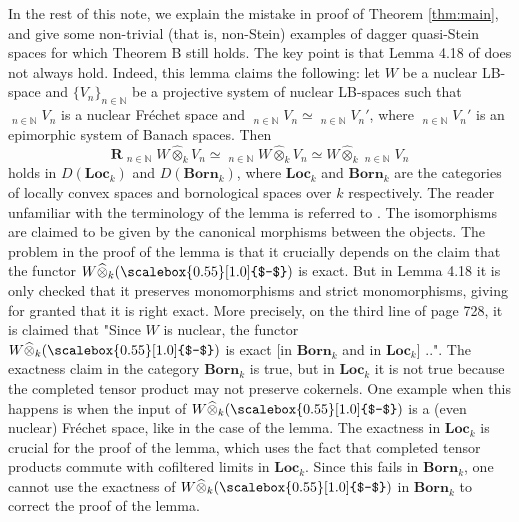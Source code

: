 \documentclass[11pt,leqno,a4paper]{amsart}
\theoremstyle{remark}
\theoremstyle{definition}
\numberwithin{equation}{theorem}
\def\N{{\mathbb N}}
\def\limpro{\mathop{\lim\limits_{\displaystyle\leftarrow}}}
\def\bBorn{\mathbf{Born}}
\def\bLoc{\mathbf{Loc}}
\def\wotimes{\widehat{\otimes}}
\newcommand{\minus}{\scalebox{0.55}[1.0]{$-$}}
\begin{document}
In the rest of this note, we explain the mistake in proof of Theorem \ref{thm:main}, and give some non-trivial (that is, non-Stein) examples of dagger quasi-Stein spaces for which Theorem B still holds. The key point is that Lemma 4.18 of \cite{Bam} does not always hold. Indeed, this lemma claims the following: let $W$ be a nuclear LB-space and $\{ V_n \}_{n \in \N}$ be a projective system of nuclear LB-spaces such that $\limpro_{n \in \N} V_n$ is a nuclear Fr\'echet space and $\limpro_{n \in \N} V_n \simeq \limpro_{n \in \N} V_n'$, where $\limpro_{n \in \N} V_n'$ is an epimorphic system of Banach spaces. Then
\[ \mathbf{R} \!\limpro_{n \in \N} W \wotimes_k V_n \simeq \limpro_{n \in \N} W \wotimes_k V_n \simeq W \wotimes_k  \limpro_{n \in \N} V_n  \]
holds in $D(\bLoc_k)$ and $D(\bBorn_k)$, where $\bLoc_k$ and $\bBorn_k$ are the categories of locally convex spaces and bornological spaces over $k$ respectively. The reader unfamiliar with the terminology of the lemma is referred to \cite{Bam}. The isomorphisms are claimed to be given by the canonical morphisms between the objects. 
The problem in the proof of the lemma is that it crucially depends on the claim that the functor $W \wotimes_k (\minus)$ is exact. But in Lemma 4.18 it is only checked that it preserves monomorphisms and strict monomorphisms, giving for granted that it is right exact. More precisely, on the third line of page 728, it is claimed that "Since $W$ is nuclear, the functor $W \wotimes_k (\minus)$ is exact [in $\bBorn_k$ and in $\bLoc_k$] ..". The exactness claim in the category $\bBorn_k$ is true, but in $\bLoc_k$ it is not true because the completed tensor product may not preserve cokernels. One example when this happens is when the input of $W \wotimes_k (\minus)$ is a (even nuclear) Fr\'echet space, like in the case of the lemma. The exactness in $\bLoc_k$ is crucial for the proof of the lemma, which uses the fact that completed tensor products commute with cofiltered limits in ${\bLoc}_k$. Since this fails in ${\bBorn}_k$, one cannot use the exactness of $W \wotimes_k (\minus)$ in ${\bBorn}_k$ to correct the proof of the lemma. 
\end{document}
